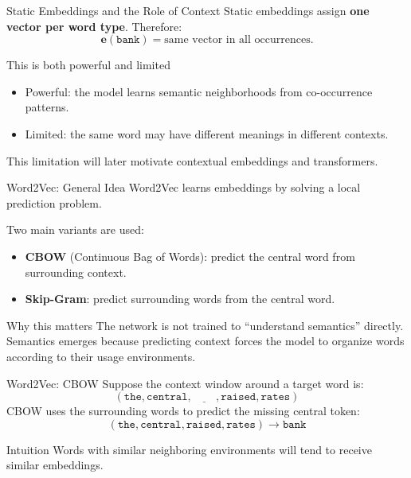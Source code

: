 \documentclass[aspectratio=169]{beamer}
\newcommand{\vect}[1]{\bm{#1}}
\begin{document}
%
%
\begin{frame}{Static Embeddings and the Role of Context}
Static embeddings assign \textbf{one vector per word type}. Therefore:
\[
\vect{e}(\texttt{bank}) = \text{same vector in all occurrences.}
\]

\vspace{0.15cm}
\begin{block}{This is both powerful and limited}
\begin{itemize}
    \item Powerful: the model learns semantic neighborhoods from co-occurrence patterns.
    \item Limited: the same word may have different meanings in different contexts.
\end{itemize}
\end{block}

\vspace{0.1cm}
This limitation will later motivate contextual embeddings and transformers.
\end{frame}
%
%
\begin{frame}{Word2Vec: General Idea}
Word2Vec learns embeddings by solving a local prediction problem.

\vspace{0.15cm}
Two main variants are used:
\begin{itemize}
    \item \textbf{CBOW} (Continuous Bag of Words): predict the central word from surrounding context.
    \item \textbf{Skip-Gram}: predict surrounding words from the central word.
\end{itemize}

\vspace{0.15cm}
\begin{block}{Why this matters}
The network is not trained to ``understand semantics'' directly. Semantics emerges because predicting context forces the model to organize words according to their usage environments.
\end{block}
\end{frame}
%
%
\begin{frame}{Word2Vec: CBOW}
Suppose the context window around a target word is:
\[
(\texttt{the},\texttt{central},\underline{\phantom{bank}},\texttt{raised},\texttt{rates})
\]
CBOW uses the surrounding words to predict the missing central token:
\[
(\texttt{the},\texttt{central},\texttt{raised},\texttt{rates}) \longrightarrow \texttt{bank}
\]

\vspace{0.15cm}
\begin{block}{Intuition}
Words with similar neighboring environments will tend to receive similar embeddings.
\end{block}
\end{frame}
\end{document}
